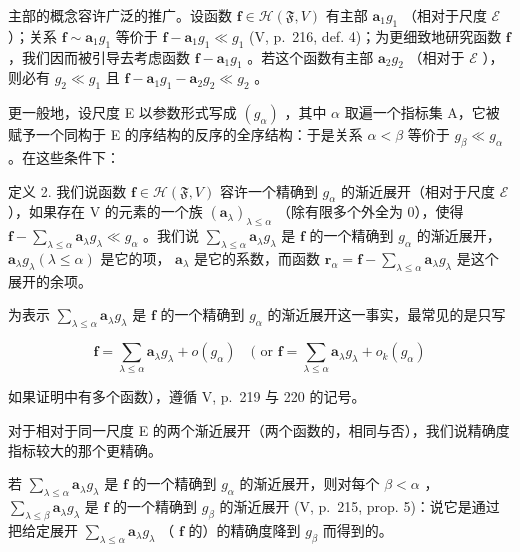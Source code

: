 主部的概念容许广泛的推广。设函数 \(\mathbf{f} \in \mathcal{H}(\mathfrak{F}, V)\) 有主部 \(\mathbf{a}_1g_1\) （相对于尺度 \(\mathcal{E}\) ）；关系 \(\mathbf{f} \sim \mathbf{a}_1g_1\) 等价于 \(\mathbf{f} - \mathbf{a}_1g_1 \ll g_1\) (V, p.~216, def. 4)；为更细致地研究函数 \(\mathbf{f}\) ，我们因而被引导去考虑函数 \(\mathbf{f} - \mathbf{a}_1g_1\) 。若这个函数有主部 \(\mathbf{a}_2g_2\) （相对于 \(\mathcal{E}\) ），则必有 \(g_2 \ll g_1\) 且 \(\mathbf{f} - \mathbf{a}_1g_1 - \mathbf{a}_2g_2 \ll g_2\) 。

更一般地，设尺度 E 以参数形式写成 \((g_{\alpha})\) ，其中 \(\alpha\) 取遍一个指标集 A，它被赋予一个同构于 E 的序结构的反序的全序结构：于是关系 \(\alpha < \beta\) 等价于 \(g_{\beta} \ll g_{\alpha}\) 。在这些条件下：

定义 2. 我们说函数 \(\mathbf{f} \in \mathcal{H}(\mathfrak{F}, V)\) 容许一个精确到 \(g_{\alpha}\) 的渐近展开（相对于尺度 \(\mathcal{E}\) ），如果存在 V 的元素的一个族 \((\mathbf{a}_{\lambda})_{\lambda \leqslant \alpha}\) （除有限多个外全为 0），使得 \(\mathbf{f} - \sum_{\lambda \leqslant \alpha} \mathbf{a}_{\lambda} g_{\lambda} \ll g_{\alpha}\) 。我们说 \(\sum_{\lambda \leqslant \alpha} \mathbf{a}_{\lambda} g_{\lambda}\) 是 \(\mathbf{f}\) 的一个精确到 \(g_{\alpha}\) 的渐近展开， \(\mathbf{a}_{\lambda} g_{\lambda} (\lambda \leqslant \alpha)\) 是它的项， \(\mathbf{a}_{\lambda}\) 是它的系数，而函数 \(\mathbf{r}_{\alpha} = \mathbf{f} - \sum_{\lambda \leqslant \alpha} \mathbf{a}_{\lambda} g_{\lambda}\) 是这个展开的余项。

为表示 \(\sum_{\lambda \leqslant \alpha} \mathbf{a}_{\lambda} g_{\lambda}\) 是 \(\mathbf{f}\) 的一个精确到 \(g_{\alpha}\) 的渐近展开这一事实，最常见的是只写

\[
\mathbf {f} = \sum_ {\lambda \leqslant \alpha} \mathbf {a} _ {\lambda} g _ {\lambda} + o (g _ {\alpha}) \quad (\text { or } \mathbf {f} = \sum_ {\lambda \leqslant \alpha} \mathbf {a} _ {\lambda} g _ {\lambda} + o _ {k} (g _ {\alpha})
\]

如果证明中有多个函数），遵循 V, p.~219 与 220 的记号。

对于相对于同一尺度 E 的两个渐近展开（两个函数的，相同与否），我们说精确度指标较大的那个更精确。

若 \(\sum_{\lambda \leqslant \alpha} \mathbf{a}_{\lambda} g_{\lambda}\) 是 \(\mathbf{f}\) 的一个精确到 \(g_{\alpha}\) 的渐近展开，则对每个 \(\beta < \alpha\) ， \(\sum_{\lambda \leqslant \beta} \mathbf{a}_{\lambda} g_{\lambda}\) 是 \(\mathbf{f}\) 的一个精确到 \(g_{\beta}\) 的渐近展开 (V, p.~215, prop. 5)：说它是通过把给定展开 \(\sum_{\lambda \leqslant \alpha} \mathbf{a}_{\lambda} g_{\lambda}\) （ \(\mathbf{f}\) 的）的精确度降到 \(g_{\beta}\) 而得到的。

